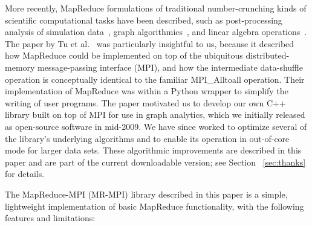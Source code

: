 More recently, MapReduce formulations of traditional number-crunching
kinds of scientific computational tasks have been described, such as
post-processing analysis of simulation data~\cite{Tu08}, graph
algorithmics~\cite{Cohen09}, and linear algebra
operations~\cite{Ekanayake09}.  The paper by Tu et al.~\cite{Tu08} was
particularly insightful to us, because it described how MapReduce
could be implemented on top of the ubiquitous distributed-memory
message-passing interface (MPI), and how the intermediate data-shuffle
operation is conceptually identical to the familiar MPI\_Alltoall
operation.  Their implementation of MapReduce was within a Python
wrapper to simplify the writing of user programs.  The paper motivated
us to develop our own C++ library built on top of MPI for use in graph
analytics, which we initially released as open-source software in
mid-2009.  We have since worked to optimize several of the library's
underlying algorithms and to enable its operation in out-of-core mode
for larger data sets.  These algorithmic improvements are described in
this paper and are part of the current downloadable version; see
Section ~\ref{sec:thanks} for details.

The MapReduce-MPI (MR-MPI) library described in this paper is a
simple, lightweight implementation of basic MapReduce functionality,
with the following features and limitations:

